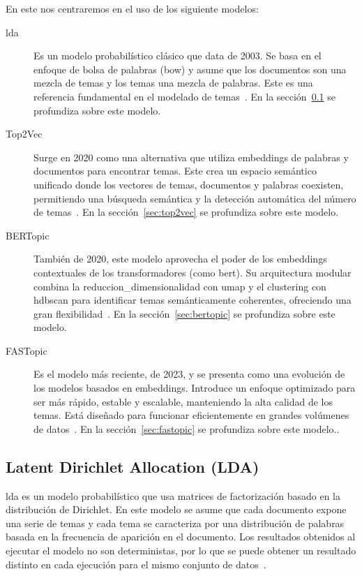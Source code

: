 En este  nos centraremos en el uso de los siguiente modelos:
\begin{description}
	\item[\acrfull{lda}] Es un modelo probabilístico clásico que data
	      de 2003. Se basa en el enfoque de bolsa de palabras (\acrshort{bow}) y asume que los
	      documentos son una mezcla de temas y los temas una mezcla de palabras. Este es
	      una referencia fundamental en el modelado de temas~\cite{blei2003lda}. En la
	      sección~\ref{sec:lda} se profundiza sobre este modelo.
	\item[Top2Vec] Surge en 2020 como una alternativa que utiliza \gls{embeddings} de
	      palabras y documentos para encontrar temas. Este crea un espacio semántico
	      unificado donde los vectores de temas, documentos y palabras coexisten,
	      permitiendo una búsqueda semántica y la detección automática del número de
	      temas~\cite{angelovTop2VecDistributedRepresentations2020}. En la
	      sección~\ref{sec:top2vec} se profundiza sobre este modelo.
	\item[BERTopic] También de 2020, este modelo aprovecha el poder de los
	      \gls{embeddings} contextuales de los transformadores (como \acrshort{bert}). Su
	      arquitectura modular combina la \gls{reduccion_dimensionalidad} con
	      \acrshort{umap} y el \gls{clustering} con \acrshort{hdbscan} para identificar
	      temas semánticamente coherentes, ofreciendo una gran
	      flexibilidad~\cite{grootendorstBERTopicNeuralTopic2022}. En la
	      sección~\ref{sec:bertopic} se profundiza sobre este modelo.
	\item[FASTopic] Es el modelo más reciente, de 2023, y se presenta como una evolución
	      de los modelos basados en \gls{embeddings}. Introduce un enfoque optimizado
	      para ser más rápido, estable y escalable, manteniendo la alta calidad de los
	      temas. Está diseñado para funcionar eficientemente en grandes volúmenes de
	      datos~\cite{2024arXiv240517978W}. En la sección~\ref{sec:fastopic} se
	      profundiza sobre este modelo..
\end{description}

\subsection{Latent Dirichlet Allocation (LDA)}\label{sec:lda}

\acrfull{lda} es un modelo
probabilístico que usa matrices de factorización basado en la distribución de
Dirichlet. En este modelo se asume que cada documento expone una serie de temas
y cada tema se caracteriza por una distribución de palabras basada en la
frecuencia de aparición en el documento. Los resultados obtenidos al ejecutar
el modelo no son deterministas, por lo que se puede obtener un resultado
distinto en cada ejecución para el mismo conjunto de
datos~\cite{phdTopicModelingAlgorithms2023,bismiTopicModellingUsing2023a}.

